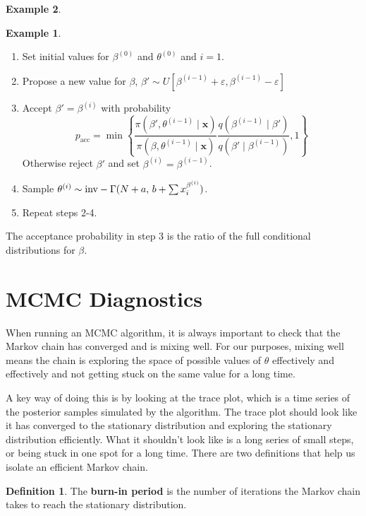 \documentclass[
]{book}
\providecommand{\tightlist}{%
  \setlength{\itemsep}{0pt}\setlength{\parskip}{0pt}}
\theoremstyle{definition}
\newtheorem{definition}{Definition}[chapter]
\theoremstyle{definition}
\newtheorem{example}{Example}[chapter]
\theoremstyle{definition}
\theoremstyle{definition}
\theoremstyle{remark}
\begin{document}
\begin{example}
\begin{example}
\begin{enumerate}
\def\labelenumi{\arabic{enumi}.}
\tightlist
\item
  Set initial values for \(\beta^{(0)}\) and \(\theta^{(0)}\) and \(i = 1\).
\item
  Propose a new value for \(\beta\), \(\beta' \sim U[\beta^{(i-1)} + \varepsilon, \beta^{(i-1)} - \varepsilon]\)
\item
  Accept \(\beta' = \beta^{(i)}\) with probability
  \[
  p_{\textrm{acc}} = \min\left\{\frac{\pi(\beta', \theta^{(i-1)} \mid \boldsymbol{x})}{\pi(\beta, \theta^{(i-1)} \mid \boldsymbol{x})}\frac{q(\beta^{(i-1)} \mid \beta')}{q(\beta' \mid \beta^{(i-1)})} , 1\right\}
  \]
  Otherwise reject \(\beta'\) and set \(\beta^{(i)} = \beta^{(i-1)}\).
\item
  Sample \(\theta^{(i)} \sim \hbox{inv}-\Gamma(N + a,\, b + \sum x_i^{\beta^{(i)}})\).
\item
  Repeat steps 2-4.
\end{enumerate}

The acceptance probability in step 3 is the ratio of the full conditional distributions for \(\beta\).
\end{example}

\section{MCMC Diagnostics}\label{mcmc-diagnostics}

When running an MCMC algorithm, it is always important to check that the Markov chain has converged and is mixing well. For our purposes, mixing well means the chain is exploring the space of possible values of \(\theta\) effectively and effectively and not getting stuck on the same value for a long time.

A key way of doing this is by looking at the trace plot, which is a time series of the posterior samples simulated by the algorithm. The trace plot should look like it has converged to the stationary distribution and exploring the stationary distribution efficiently. What it shouldn't look like is a long series of small steps, or being stuck in one spot for a long time. There are two definitions that help us isolate an efficient Markov chain.

\begin{definition}
The \textbf{burn-in period} is the number of iterations the Markov chain takes to reach the stationary distribution.
\end{definition}


\end{example}
\end{document}
